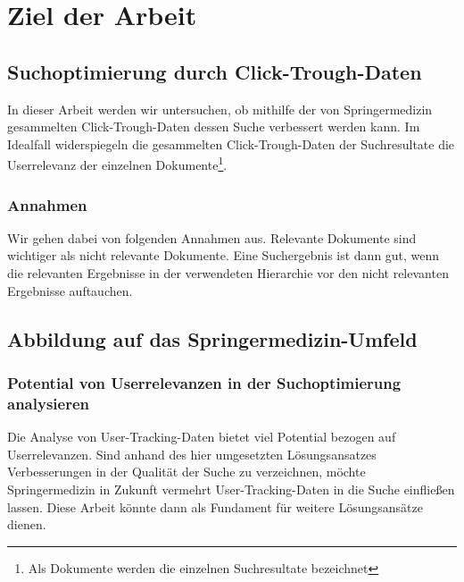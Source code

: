 \section{Ziel der Arbeit}
\label{sec:Einfuehrung:ZielArbeit}

\subsection{Suchoptimierung durch Click-Trough-Daten}
\label{sec:Einfuehrung:ZielArbeit:Suchoptimierung}

In dieser Arbeit werden wir untersuchen, ob mithilfe der von Springermedizin gesammelten Click-Trough-Daten dessen Suche verbessert werden kann. Im Idealfall widerspiegeln die gesammelten Click-Trough-Daten der Suchresultate die Userrelevanz der einzelnen Dokumente\footnote{Als Dokumente werden die einzelnen Suchresultate bezeichnet}.

\subsubsection{Annahmen}
\label{sec:Einfuehrung:ZielArbeit:Suchoptimierung:Annahmen}

Wir gehen dabei von folgenden Annahmen aus. Relevante Dokumente sind wichtiger als nicht relevante Dokumente. Eine Suchergebnis ist dann gut, wenn die relevanten Ergebnisse in der verwendeten Hierarchie vor den nicht relevanten Ergebnisse auftauchen. 

\subsection{Abbildung auf das Springermedizin-Umfeld}
\label{sec:Einfuehrung:ZielArbeit:AbbildungSpringermedizinUmfeld}

\subsubsection{Potential von Userrelevanzen in der Suchoptimierung analysieren}
\label{sec:Einfuehrung:ZielArbeit:Potential}

Die Analyse von User-Tracking-Daten bietet viel Potential bezogen auf Userrelevanzen. Sind anhand des hier umgesetzten Lösungsansatzes Verbesserungen in der Qualität der Suche zu verzeichnen, möchte Springermedizin in Zukunft vermehrt User-Tracking-Daten in die Suche einfließen lassen. Diese Arbeit könnte dann als Fundament für weitere Lösungsansätze dienen.

